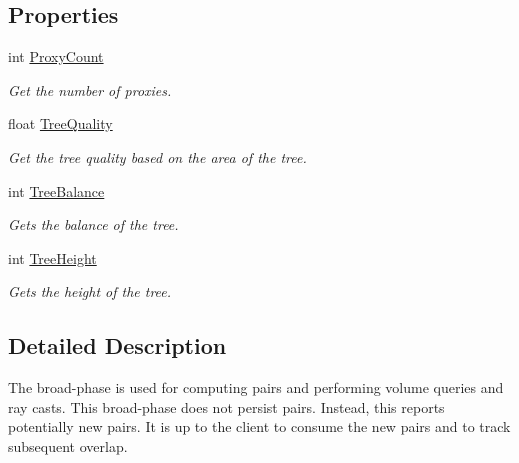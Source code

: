 \subsection*{Properties}
\begin{DoxyCompactItemize}
\item 
int \hyperlink{class_farseer_physics_1_1_collision_1_1_dynamic_tree_broad_phase_a3d2c33f76707c70fe4c8fc3964c50264}{Proxy\+Count}
\begin{DoxyCompactList}\small\item\em Get the number of proxies. \end{DoxyCompactList}\item 
float \hyperlink{class_farseer_physics_1_1_collision_1_1_dynamic_tree_broad_phase_a73c192ad114e8d962ccea45913a4edc5}{Tree\+Quality}
\begin{DoxyCompactList}\small\item\em Get the tree quality based on the area of the tree. \end{DoxyCompactList}\item 
int \hyperlink{class_farseer_physics_1_1_collision_1_1_dynamic_tree_broad_phase_a606b1f77d415f9a37c47a7c7e47a0039}{Tree\+Balance}
\begin{DoxyCompactList}\small\item\em Gets the balance of the tree. \end{DoxyCompactList}\item 
int \hyperlink{class_farseer_physics_1_1_collision_1_1_dynamic_tree_broad_phase_a0f6cc4b6cb6b8919a986ffa2d0ae382d}{Tree\+Height}
\begin{DoxyCompactList}\small\item\em Gets the height of the tree. \end{DoxyCompactList}\end{DoxyCompactItemize}


\subsection{Detailed Description}
The broad-\/phase is used for computing pairs and performing volume queries and ray casts. This broad-\/phase does not persist pairs. Instead, this reports potentially new pairs. It is up to the client to consume the new pairs and to track subsequent overlap. 



